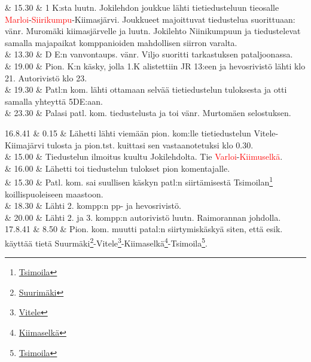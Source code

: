 \documentclass[11pt,a5paper,oneside]{book}
\begin{document}
& 15.30 & 1 K:sta luutn. Jokilehdon joukkue lähti tietiedusteluun tieosalle \textcolor{red}{Marloi}-\textcolor{red}{Siirikumpu}-Kiimasjärvi. \newline Joukkueet majoittuvat tiedustelua suorittuaan: vänr. Muromäki kiimasjärvelle ja luutn. Jokilehto Niinikumpuun ja tiedustelevat samalla majapaikat komppanioiden mahdollisen siirron varalta. \\

& 13.30 & D E:n vanvontaups. vänr. Viljo suoritti tarkastuksen pataljoonassa. \\

& 19.00 & Pion. K:n käsky, jolla 1.K alistettiin JR 13:een ja hevosrivistö lähti klo 21. Autorivistö klo 23. \\

& 19.30 & Patl:n kom. lähti ottamaan selvää tietiedustelun tuloksesta ja otti samalla yhteyttä 5DE:aan. \\

& 23.30 & Palasi patl. kom. tiedustelusta ja toi vänr. Murtomäen selostuksen. \\

\taulustop


16.8.41 & 0.15 & Lähetti lähti viemään pion. kom:lle tietiedustelun Vitele-Kiimajärvi tulosta ja pion.tst. kuittasi sen vastaanotetuksi klo 0.30. \\

& 15.00 & Tiedustelun ilmoitus kuultu Jokilehdolta. Tie \textcolor{red}{Varloi}-\textcolor{red}{Kiimuselkä}. \\

& 16.00 & Lähetti toi tiedustelun tulokset pion komentajalle. \\

& 15.30 & Patl. kom. sai suullisen käskyn patl:n siirtämisestä Tsimoilan\footnote{\href{https://www.google.fi/maps/place/61\%C2\%B013'40.5\%22N+32\%C2\%B044'50.1\%22E/@61.227911,32.7450663,906m/}{Tsimoila}} koillispuoleiseen maastoon. \\

& 18.30 & Lähti 2. kompp:n pp- ja hevosrivistö. \\

& 20.00 & Lähti 2. ja 3. kompp:n autorivistö luutn. Raimorannan johdolla. \newline \\

17.8.41 & 8.50 & Pion. kom. muutti patal:n siirtymiskäskyä siten, että esik. käyttää tietä Suurmäki\footnote{\href{https://www.google.fi/maps/place/Bol'shiye+Gory,+Republic+of+Karelia,+Russia/}{Suurimäki}}-Vitele\footnote{\href{https://www.google.fi/maps/place/Vidlitsa,+Republic+of+Karelia,+Russia,+186007/}{Vitele}}-Kiimaselkä\footnote{\href{https://www.google.fi/maps/place/Kimusel'gskoye/@61.200226,32.7254117,16z/}{Kiimaselkä}}-Tsimoila\footnote{\href{https://www.google.fi/maps/place/61\%C2\%B013'40.5\%22N+32\%C2\%B044'50.1\%22E/@61.227911,32.7450663,906m/}{Tsimoila}}. \\
\end{document}
